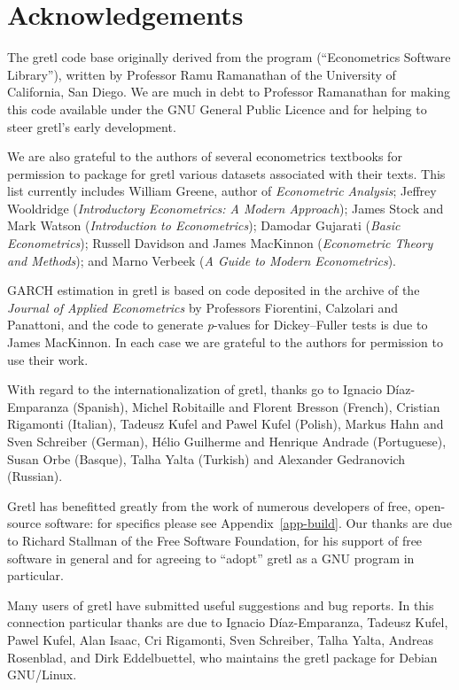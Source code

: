 \section{Acknowledgements}
\label{ack}

The gretl code base originally derived from the program
 (``Econometrics Software Library''), written by Professor
Ramu Ramanathan of the University of California, San Diego.  
We are much in debt to Professor Ramanathan for making this code
available under the GNU General Public Licence and for helping to
steer gretl's early development.

We are also grateful to the authors of several econometrics textbooks
for permission to package for gretl various datasets associated
with their texts.  This list currently includes William Greene, author
of \emph{Econometric Analysis}; Jeffrey Wooldridge (\emph{Introductory
  Econometrics: A Modern Approach}); James Stock and Mark Watson
(\emph{Introduction to Econometrics}); Damodar Gujarati (\emph{Basic
  Econometrics}); Russell Davidson and James MacKinnon
(\emph{Econometric Theory and Methods}); and Marno Verbeek (\emph{A
  Guide to Modern Econometrics}).

GARCH estimation in gretl is based on code deposited in the
archive of the \emph{Journal of Applied Econometrics} by Professors
Fiorentini, Calzolari and Panattoni, and the code to generate
\emph{p}-values for Dickey--Fuller tests is due to James MacKinnon.  In
each case we are grateful to the authors for permission to use their
work.

With regard to the internationalization of gretl, thanks go to
Ignacio Díaz-Emparanza (Spanish), Michel Robitaille and Florent
Bresson (French), Cristian Rigamonti (Italian), Tadeusz Kufel and
Pawel Kufel (Polish), Markus Hahn and Sven Schreiber (German), Hélio
Guilherme and Henrique Andrade (Portuguese), Susan Orbe (Basque),
Talha Yalta (Turkish) and Alexander Gedranovich (Russian).

Gretl has benefitted greatly from the work of numerous
developers of free, open-source software: for specifics please see
Appendix~\ref{app-build}.  Our thanks are due to Richard Stallman
of the Free Software Foundation, for his support of free software in
general and for agreeing to ``adopt'' gretl as a GNU program in
particular.

Many users of gretl have submitted useful suggestions and bug
reports.  In this connection particular thanks are due to Ignacio
Díaz-Emparanza, Tadeusz Kufel, Pawel Kufel, Alan Isaac, Cri Rigamonti,
Sven Schreiber, Talha Yalta, Andreas Rosenblad, and Dirk Eddelbuettel,
who maintains the gretl package for Debian GNU/Linux.


